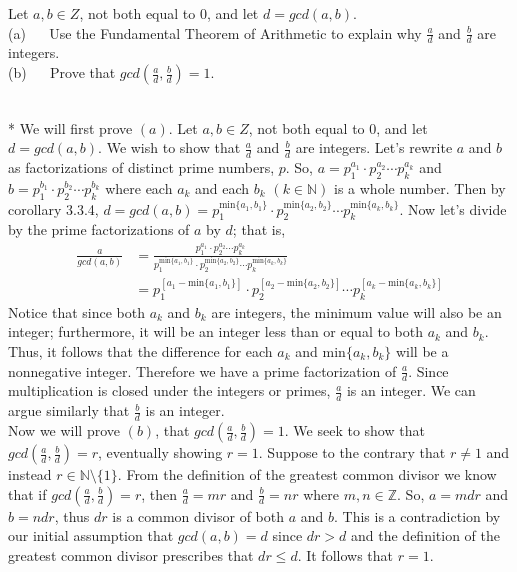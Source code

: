 \documentclass[10pt]{article}
\makeatletter
\newcommand{\N}{\mathbb{N}}
\newcommand{\Z}{\mathbb{Z}}
\newenvironment{question}[2][Question]{\begin{trivlist}
\item[\hskip \labelsep {\bfseries #1}\hskip \labelsep {\bfseries #2.}]}{\end{trivlist}}
\renewenvironment{proof}[1][\proofname]{\par
\pushQED{\qed}
\normalfont \topsep6\p@\@plus6\p@\relax
\trivlist
\item[\hskip\labelsep\itshape#1\@addpunct{.}]\mbox{}\\*}{\popQED\endtrivlist\@endpefalse}
\makeatother
\begin{document}
\begin{question}{6}
	Let $a, b \in Z$, not both equal to $0$, and let $d = gcd(a, b)$.\\
	(a) $\quad$ Use the Fundamental Theorem of Arithmetic to explain why $\frac a d$ and $\frac b d$ are integers. \\
	(b) $\quad$ Prove that $gcd(\frac a d, \frac b d) = 1$.
    \begin{proof}
		We will first prove $(a)$. Let $a, b \in Z$, not both equal to $0$, and let $d = gcd(a, b)$. We wish to show that $\frac a d$ and $\frac b d$ are integers. Let's rewrite $a$ and $b$ as factorizations of distinct prime numbers, $p$. So, $a = p_1^{a_1} \cdot p_2^{a_2} \cdots p_k^{a_k}$ and $b = p_1^{b_1} \cdot p_2^{b_2} \cdots p_k^{b_k}$ where each $a_k$ and each $b_k$ $(k \in \N)$ is a whole number. Then by corollary 3.3.4, $d = gcd(a,b) = p_1^{\text{min}\{a_1,b_1\}} \cdot p_2^{\text{min}\{a_2,b_2\}} \cdots p_k^{\text{min}\{a_k,b_k\}}$. Now let's divide by the prime factorizations of $a$ by $d$; that is, 
		\begin{align*}
			\frac {a}{gcd(a,b)} &= \frac {p_1^{a_1} \cdot p_2^{a_2} \cdots p_k^{a_k}}{p_1^{\text{min}\{a_1,b_1\}} \cdot p_2^{\text{min}\{a_2,b_2\}} \cdots p_k^{\text{min}\{a_k,b_k\}}}\\
			&= p_{1}^{[a_1 - \text{min}\{a_1,b_1\}]} \cdot p_{2}^{[a_2 - \text{min}\{a_2,b_2\}]} \cdots p_{k}^{[a_k - \text{min}\{a_k,b_k\}]}
		\end{align*}
		Notice that since both $a_k$ and $b_k$ are integers, the minimum value will also be an integer; furthermore, it will be an integer less than or equal to both $a_k$ and $b_k$. Thus, it follows that the difference for each $a_k$ and $\text{min}\{a_k,b_k\}$ will be a nonnegative integer. Therefore we have a prime factorization of $\frac a d$. Since multiplication is closed under the integers or primes, $\frac a d$ is an integer. We can argue similarly that $\frac b d$ is an integer.
		\vspace{5mm} \\ 
        Now we will prove $(b)$, that $gcd(\frac a d , \frac b d) = 1$. We seek to show that $gcd(\frac a d , \frac b d) = r$, eventually showing $r =1$. Suppose to the contrary that $r \neq 1$ and instead $r \in \N \setminus \{1\}$. From the definition of the greatest common divisor we know that if $gcd(\frac a d , \frac b d) = r$, then $\frac a d = mr$ and $\frac b d = nr$ where $m,n \in \Z$. So, $a = mdr$ and $b = ndr$, thus $dr$ is a common divisor of both $a$ and $b$. This is a contradiction by our initial assumption that $gcd(a,b)=d$ since $dr > d$ and the definition of the greatest common divisor prescribes that $dr \le d$. It follows that $r = 1$.
    \end{proof}

\end{question}
\end{document}
